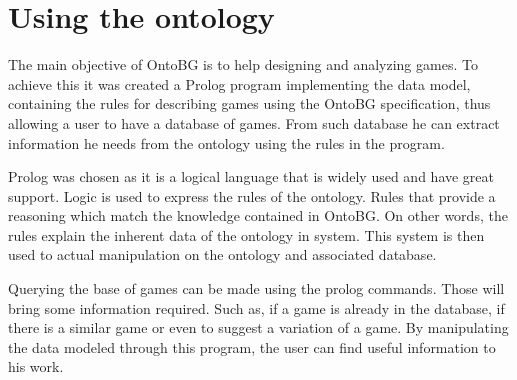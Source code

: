 \section{Using the ontology}

The main objective of OntoBG is to help designing and analyzing games. To achieve this it was created a Prolog program implementing the data model, containing the rules for describing games using the OntoBG specification, thus allowing a user to have a database of games. From such database he can extract information he needs from the ontology using the rules in the program.

Prolog was chosen as it is a logical language that is widely used and have great support. Logic is used to express the rules of the ontology. Rules that provide a reasoning which match the knowledge contained in OntoBG. On other words, the rules explain the inherent data of the ontology in system. This system is then used to actual manipulation on the ontology and associated database. 

Querying the base of games can be made using the prolog commands. Those will bring some information required. Such as, if a game is already in the database, if there is a similar game or even to suggest a variation of a game. By manipulating the data modeled through this program, the user can find useful information to his work. 

